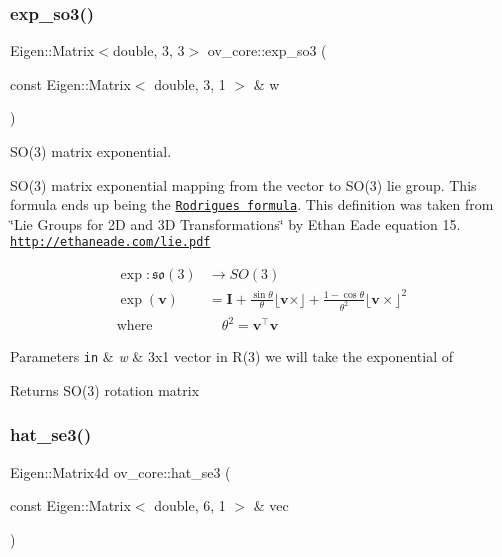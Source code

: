 \subsubsection{\texorpdfstring{exp\+\_\+so3()}{exp\_so3()}}
{\footnotesize\ttfamily Eigen\+::\+Matrix$<$double, 3, 3$>$ ov\+\_\+core\+::exp\+\_\+so3 (\begin{DoxyParamCaption}\item[{const Eigen\+::\+Matrix$<$ double, 3, 1 $>$ \&}]{w }\end{DoxyParamCaption})\hspace{0.3cm}{\ttfamily [inline]}}



S\+O(3) matrix exponential. 

S\+O(3) matrix exponential mapping from the vector to S\+O(3) lie group. This formula ends up being the \href{https://en.wikipedia.org/wiki/Rodrigues%27_rotation_formula}{\tt Rodrigues formula}. This definition was taken from \char`\"{}\+Lie Groups for 2\+D and 3\+D Transformations\char`\"{} by Ethan Eade equation 15. \href{http://ethaneade.com/lie.pdf}{\tt http\+://ethaneade.\+com/lie.\+pdf}

\begin{align*} \exp\colon\mathfrak{so}(3)&\to SO(3) \\ \exp(\mathbf{v}) &= \mathbf{I} +\frac{\sin{\theta}}{\theta}\lfloor\mathbf{v}\times\rfloor +\frac{1-\cos{\theta}}{\theta^2}\lfloor\mathbf{v}\times\rfloor^2 \\ \mathrm{where}&\quad \theta^2 = \mathbf{v}^\top\mathbf{v} \end{align*}


\begin{DoxyParams}[1]{Parameters}
\mbox{\tt in}  & {\em w} & 3x1 vector in R(3) we will take the exponential of \\
\hline
\end{DoxyParams}
\begin{DoxyReturn}{Returns}
S\+O(3) rotation matrix 
\end{DoxyReturn}
\mbox{\label{namespaceov__core_a2854f4368bab599be2404f396f5ee434}} 
\subsubsection{\texorpdfstring{hat\+\_\+se3()}{hat\_se3()}}
{\footnotesize\ttfamily Eigen\+::\+Matrix4d ov\+\_\+core\+::hat\+\_\+se3 (\begin{DoxyParamCaption}\item[{const Eigen\+::\+Matrix$<$ double, 6, 1 $>$ \&}]{vec }\end{DoxyParamCaption})\hspace{0.3cm}{\ttfamily [inline]}}



